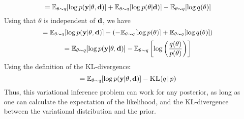 \begin{equation}= \mathbb{E}_{\theta \sim q}[\log p(\mathbf{y}| \theta , \mathbf{d})]+\mathbb{E}_{\theta \sim q}[\log p(\theta | \mathbf{d})] - \mathbb{E}_{\theta \sim q}[\log q(\theta)]\end{equation}
Using that $\theta$ is independent of $\mathbf{d}$, we have
\begin{equation}= \mathbb{E}_{\theta \sim q}[\log p(\mathbf{y}| \theta , \mathbf{d})]-(-\mathbb{E}_{\theta \sim q}[\log p(\theta)] + \mathbb{E}_{\theta \sim q}[\log q(\theta)])\end{equation}
\begin{equation}= \mathbb{E}_{\theta \sim q}[\log p(\mathbf{y}| \theta , \mathbf{d})]-\mathbb{E}_{\theta \sim q}\left[\log \left(\frac{q(\theta)}{p(\theta)}\right)\right]\end{equation}
Using the definition of the KL-divergence:
\begin{equation}\label{eq:elbo-3}= \mathbb{E}_{\theta \sim q}[\log p(\mathbf{y}| \theta , \mathbf{d})]- \textsc{KL}(q || p)\end{equation}
Thus, this variational inference problem can work for any posterior, as long as one can calculate the expectation of the likelihood, and the KL-divergence between the variational distribution and the prior.

